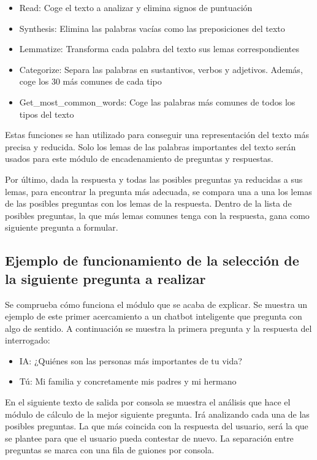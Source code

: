 \begin{itemize}
	\item Read: Coge el texto a analizar y elimina signos de puntuación
	\item Synthesis: Elimina las palabras vacías como las preposiciones del texto
	\item Lemmatize: Transforma cada palabra del texto sus lemas correspondientes
	\item Categorize: Separa las palabras en sustantivos, verbos y adjetivos. Además, coge los 30 más comunes de cada tipo
	\item Get\_most\_common\_words: Coge las palabras más comunes de todos los tipos del texto
\end{itemize}

Estas funciones se han utilizado para conseguir una representación del texto más precisa y reducida. Solo los lemas de las palabras importantes del texto serán usados para este módulo de encadenamiento de preguntas y respuestas.

Por último, dada la respuesta y todas las posibles preguntas ya reducidas a sus lemas, para encontrar la pregunta más adecuada, se compara una a una los lemas de las posibles preguntas con los lemas de la respuesta. Dentro de la lista de posibles preguntas, la que más lemas comunes tenga con la respuesta, gana como siguiente pregunta a formular.

\subsection{Ejemplo de funcionamiento de la selección de la siguiente pregunta a realizar}

Se comprueba cómo funciona el módulo que se acaba de explicar. Se muestra un ejemplo de este primer acercamiento a un chatbot inteligente que pregunta con algo de sentido. A continuación se muestra la primera pregunta y la respuesta del interrogado:

\begin{itemize}
	\item[] IA: ¿Quiénes son las personas más importantes de tu vida?
	\item[] Tú: Mi familia y concretamente mis padres y mi hermano
\end{itemize}

En el siguiente texto de salida por consola se muestra el análisis que hace el módulo de cálculo de la mejor siguiente pregunta. Irá analizando cada una de las posibles preguntas. La que más coincida con la respuesta del usuario, será la que se plantee para que el usuario pueda contestar de nuevo. La separación entre preguntas se marca con una fila de guiones por consola.

